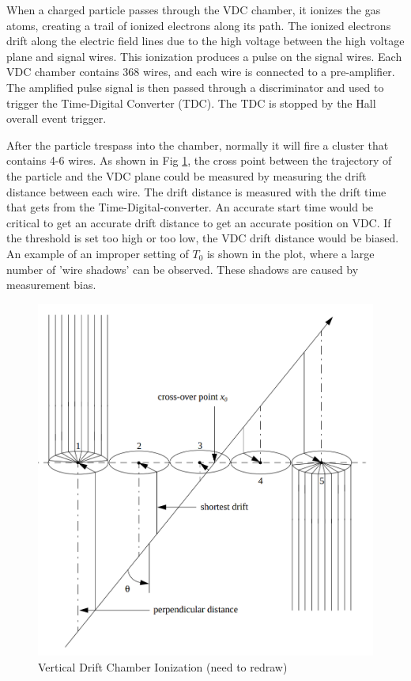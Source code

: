 When a charged particle passes through the VDC chamber, it ionizes the gas atoms, creating a trail of ionized electrons along its path. The ionized electrons drift along the electric field lines due to the high voltage between the high voltage plane and signal wires. This ionization produces a pulse on the signal wires. Each VDC chamber contains 368 wires, and each wire is connected to a pre-amplifier. The amplified pulse signal is then passed through a discriminator and used to trigger the Time-Digital Converter (TDC). The TDC is stopped by the Hall overall event trigger.

After the particle trespass into the chamber, normally it will fire a cluster that contains 4-6 wires. As shown in Fig \ref{fig:vdc_wire_ionization_cluster}, the cross point between the trajectory of the particle and the VDC plane could be measured by measuring the drift distance between each wire. The drift distance is measured with the drift time that gets from the Time-Digital-converter. An accurate start time would be critical to get an accurate drift distance to get an accurate position on VDC.  If the threshold is set too high or too low, the VDC drift distance would be biased. An example of an improper setting of $T_0$ is shown in the plot, where a large number of 'wire shadows' can be observed. These shadows are caused by measurement bias.

\begin{figure}
    \centering
    \includegraphics[scale = 0.25]{images/chap3/vdc_wire_ionize.png}
    \caption{Vertical Drift Chamber Ionization (need to redraw)}
    \label{fig:vdc_wire_ionization_cluster}
\end{figure}

